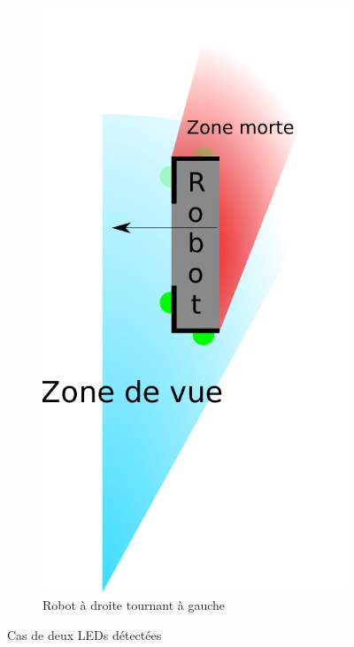 \begin{itemize}
\begin{figure}[H]
\begin{subfigure}[h]{0.2\textwidth}
					        \includegraphics[width=\textwidth]{Graphics/casClignotants_GG.pdf}
					        \caption{Robot à droite tournant à gauche}
					    \end{subfigure}
					    \caption{Cas de deux LEDs détectées}
					\end{figure}


\end{itemize}
